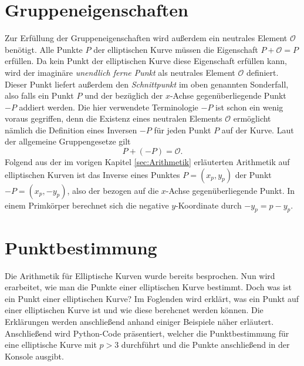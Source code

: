 \section{Gruppeneigenschaften} \label{sec:Gruppeneigenschaften}
Zur Erfüllung der Gruppeneigenschaften wird außerdem ein neutrales Element $\mathcal{O}$ benötigt. Alle Punkte $P$ der elliptischen Kurve müssen die Eigenschaft $P + \mathcal{O} = P$ erfüllen. Da kein Punkt der elliptischen Kurve diese Eigenschaft erfüllen kann, wird der imaginäre \textit{unendlich ferne Punkt} als neutrales Element $\mathcal{O}$ definiert. Dieser Punkt liefert außerdem den \textit{Schnittpunkt} im oben genannten Sonderfall, also falls ein Punkt $P$ und der bezüglich der $x$-Achse gegenüberliegende Punkt $-P$ addiert werden. Die hier verwendete Terminologie $-P$ ist schon ein wenig voraus gegriffen, denn die Existenz eines neutralen Elements $\mathcal{O}$ ermöglicht nämlich die Definition eines Inversen $-P$ für jeden Punkt $P$ auf der Kurve. Laut der allgemeine Gruppengesetze gilt $$P + (-P) = \mathcal{O}.$$
Folgend aus der im vorigen Kapitel \ref{sec:Arithmetik} erläuterten Arithmetik auf elliptischen Kurven ist das Inverse eines Punktes $P = (x_p, y_p)$ der Punkt $-P = (x_p, -y_p)$, also der bezogen auf die $x$-Achse gegenüberliegende Punkt. In einem Primkörper berechnet sich die negative $y$-Koordinate durch $-y_p = p - y_p$.\cite[279]{Paar.2016}

 
\section{Punktbestimmung}
Die Arithmetik für Elliptische Kurven wurde bereits besprochen. Nun wird erarbeitet, wie man die Punkte einer elliptischen Kurve bestimmt. Doch was ist ein Punkt einer elliptischen Kurve? Im Foglenden wird erklärt, was ein Punkt auf einer elliptischen Kurve ist und wie diese berehcnet werden können. Die Erklärungen werden anschließend anhand einiger Beispiele näher erläutert. Anschließend wird Python-Code präsentiert, welcher die Punktbestimmung für eine elliptische Kurve mit $p > 3$ durchführt und die Punkte anschließend in der Konsole ausgibt.

